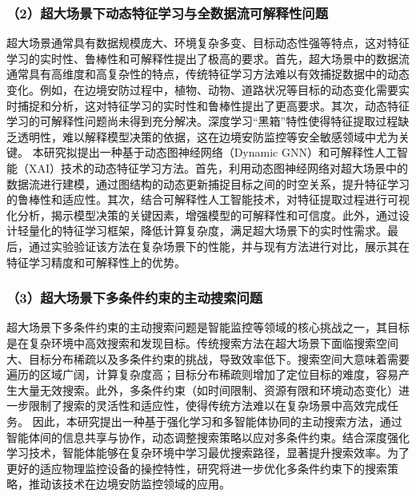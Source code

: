 \subsubsection*{\bfseries （2）超大场景下动态特征学习与全数据流可解释性问题}
超大场景通常具有数据规模庞大、环境复杂多变、目标动态性强等特点，这对特征学习的实时性、鲁棒性和可解释性提出了极高的要求。首先，超大场景中的数据流通常具有高维度和高复杂性的特点，传统特征学习方法难以有效捕捉数据中的动态变化。例如，在边境安防过程中，植物、动物、道路状况等目标的动态变化需要实时捕捉和分析，这对特征学习的实时性和鲁棒性提出了更高要求。其次，动态特征学习的可解释性问题尚未得到充分解决。深度学习“黑箱”特性使得特征提取过程缺乏透明性，难以解释模型决策的依据，这在边境安防监控等安全敏感领域中尤为关键。
本研究拟提出一种基于动态图神经网络（Dynamic GNN）和可解释性人工智能（XAI）技术的动态特征学习方法。首先，利用动态图神经网络对超大场景中的数据流进行建模，通过图结构的动态更新捕捉目标之间的时空关系，提升特征学习的鲁棒性和适应性。其次，结合可解释性人工智能技术，对特征提取过程进行可视化分析，揭示模型决策的关键因素，增强模型的可解释性和可信度。此外，通过设计轻量化的特征学习框架，降低计算复杂度，满足超大场景下的实时性需求。最后，通过实验验证该方法在复杂场景下的性能，并与现有方法进行对比，展示其在特征学习精度和可解释性上的优势。

\subsubsection*{\bfseries （3）超大场景下多条件约束的主动搜索问题}

超大场景下多条件约束的主动搜索问题是智能监控等领域的核心挑战之一，其目标是在复杂环境中高效搜索和发现目标。传统搜索方法在超大场景下面临搜索空间大、目标分布稀疏以及多条件约束的挑战，导致效率低下。搜索空间大意味着需要遍历的区域广阔，计算复杂度高；目标分布稀疏则增加了定位目标的难度，容易产生大量无效搜索。此外，多条件约束（如时间限制、资源有限和环境动态变化）进一步限制了搜索的灵活性和适应性，使得传统方法难以在复杂场景中高效完成任务。
因此，本研究提出一种基于强化学习和多智能体协同的主动搜索方法，通过智能体间的信息共享与协作，动态调整搜索策略以应对多条件约束。结合深度强化学习技术，智能体能够在复杂环境中学习最优搜索路径，显著提升搜索效率。为了更好的适应物理监控设备的操控特性，研究将进一步优化多条件约束下的搜索策略，推动该技术在边境安防监控领域的应用。